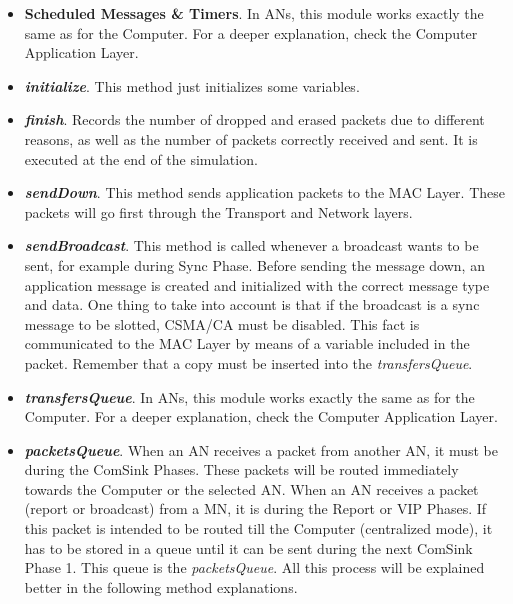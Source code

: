 \begin{itemize}
  \item \textbf{Scheduled Messages \& Timers}. In \acp{AN}, this module works exactly the same as for the Computer. For a deeper explanation, check
  the Computer Application Layer.

  \item \textbf{\textit{initialize}}. This method just initializes some variables.

  \item \textbf{\textit{finish}}. Records the number of dropped and erased packets due to different reasons, as well as the number of packets
  correctly received and sent. It is executed at the end of the simulation.

  \item \textbf{\textit{sendDown}}. This method sends application packets to the \ac{MAC} Layer. These packets will go first through the Transport 
  and Network layers.

  \item \textbf{\textit{sendBroadcast}}. This method is called whenever a broadcast wants to be sent, for example during Sync Phase. Before sending
  the message down, an application message is created and initialized with the correct message type and data. One thing to take into account is that
  if the broadcast is a sync message to be slotted, \ac{CSMA/CA} must be disabled. This fact is communicated to the \ac{MAC} Layer by means of a 
  variable included in the packet. Remember that a copy must be inserted into the \textit{transfersQueue}.

  \item \textbf{\textit{transfersQueue}}. In \acp{AN}, this module works exactly the same as for the Computer. For a deeper explanation, check
  the Computer Application Layer.

  \item \textbf{\textit{packetsQueue}}. When an \ac{AN} receives a packet from another \ac{AN}, it must be during the ComSink Phases. These packets
  will be routed immediately towards the Computer or the selected \ac{AN}. When an \ac{AN} receives a packet (report or broadcast) from a \ac{MN}, 
  it is during the Report or \ac{VIP} Phases. If this packet is intended to be routed till the Computer (centralized mode), it has to be stored in 
  a queue until it can be sent during the next ComSink Phase 1. This queue is the \textit{packetsQueue}. All this process will be explained better 
  in the following method explanations.


\end{itemize}
